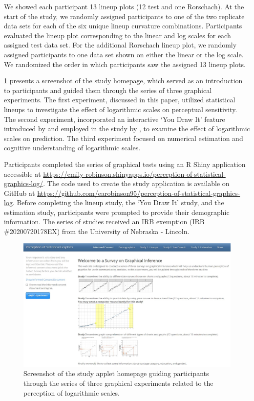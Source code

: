 \documentclass[12pt]{article}
\begin{document}
We showed each participant 13 lineup plots (12 test and one Rorschach).
At the start of the study, we randomly assigned participants to one of
the two replicate data sets for each of the six unique lineup curvature
combinations. Participants evaluated the lineup plot corresponding to
the linear and log scales for each assigned test data set. For the
additional Rorschach lineup plot, we randomly assigned participants to
one data set shown on either the linear or the log scale. We randomized
the order in which participants saw the assigned 13 lineup plots.

\cref{fig:study-homepage} presents a screenshot of the study homepage,
which served as an introduction to participants and guided them through
the series of three graphical experiments. The first experiment,
discussed in this paper, utilized statistical lineups to investigate the
effect of logarithmic scales on perceptual sensitivity. The second
experiment, incorporated an interactive `You Draw It' feature introduced
by \citet{aisch2015you} and employed in the study by
\citet{robinson2022eye}, to examine the effect of logarithmic scales on
prediction. The third experiment focused on numerical estimation and
cognitive understanding of logarithmic scales.

Participants completed the series of graphical tests using an R Shiny
application \citep{shiny_pkg} accessible at
\url{https://emily-robinson.shinyapps.io/perception-of-statistical-graphics-log/}.
The code used to create the study application is available on GitHub at
\url{https://github.com/earobinson95/perception-of-statistical-graphics-log}.
Before completing the lineup study, the `You Draw It' study, and the
estimation study, participants were prompted to provide their
demographic information. The series of studies received an IRB exemption
(IRB \#20200720178EX) from the University of Nebraska - Lincoln.

\begin{figure}[tbp]

{\centering \includegraphics[width=1\linewidth,]{images/study-homepage} 

}

\caption[Study applet homepage]{Screenshot of the study applet homepage guiding participants through the series of three graphical experiments related to the perception of logarithmic scales.}\label{fig:study-homepage}
\end{figure}
\end{document}
